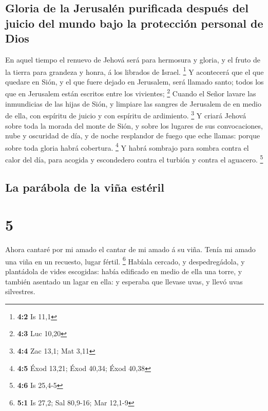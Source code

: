 \hypertarget{gloria-de-la-jerusaluxe9n-purificada-despuuxe9s-del-juicio-del-mundo-bajo-la-protecciuxf3n-personal-de-dios}{%
\subsection{Gloria de la Jerusalén purificada después del juicio del
mundo bajo la protección personal de
Dios}\label{gloria-de-la-jerusaluxe9n-purificada-despuuxe9s-del-juicio-del-mundo-bajo-la-protecciuxf3n-personal-de-dios}}

 En aquel tiempo el renuevo de Jehová será para hermosura
y gloria, y el fruto de la tierra para grandeza y honra, á los librados
de Israel. \footnote{\textbf{4:2} Is 11,1}  Y acontecerá
que el que quedare en Sión, y el que fuere dejado en Jerusalem, será
llamado santo; todos los que en Jerusalem están escritos entre los
vivientes; \footnote{\textbf{4:3} Luc 10,20}  Cuando el
Señor lavare las inmundicias de las hijas de Sión, y limpiare las
sangres de Jerusalem de en medio de ella, con espíritu de juicio y con
espíritu de ardimiento. \footnote{\textbf{4:4} Zac 13,1; Mat 3,11}
 Y criará Jehová sobre toda la morada del monte de Sión, y
sobre los lugares de sus convocaciones, nube y oscuridad de día, y de
noche resplandor de fuego que eche llamas: porque sobre toda gloria
habrá cobertura. \footnote{\textbf{4:5} Éxod 13,21; Éxod 40,34; Éxod
  40,38}  Y habrá sombrajo para sombra contra el calor del
día, para acogida y escondedero contra el turbión y contra el aguacero.
\footnote{\textbf{4:6} Is 25,4-5}

\hypertarget{la-paruxe1bola-de-la-viuxf1a-estuxe9ril}{%
\subsection{La parábola de la viña
estéril}\label{la-paruxe1bola-de-la-viuxf1a-estuxe9ril}}

\hypertarget{section-4}{%
\section{5}\label{section-4}}

 Ahora cantaré por mi amado el cantar de mi amado á su
viña. Tenía mi amado una viña en un recuesto, lugar fértil. \footnote{\textbf{5:1}
  Is 27,2; Sal 80,9-16; Mar 12,1-9}  Habíala cercado, y
despedregádola, y plantádola de vides escogidas: había edificado en
medio de ella una torre, y también asentado un lagar en ella: y esperaba
que llevase uvas, y llevó uvas silvestres.

